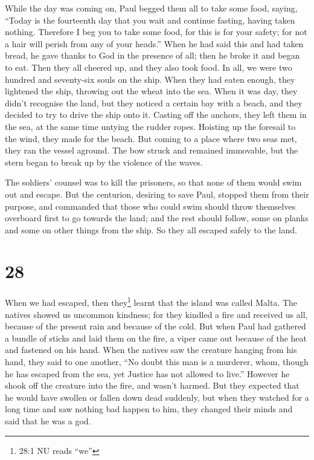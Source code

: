  While the day was coming on, Paul begged them all to take
some food, saying, ``Today is the fourteenth day that you wait and
continue fasting, having taken nothing.  Therefore I beg
you to take some food, for this is for your safety; for not a hair will
perish from any of your heads.''  When he had said this and
had taken bread, he gave thanks to God in the presence of all; then he
broke it and began to eat.  Then they all cheered up, and
they also took food.  In all, we were two hundred and
seventy-six souls on the ship.  When they had eaten enough,
they lightened the ship, throwing out the wheat into the sea.
 When it was day, they didn't recognise the land, but they
noticed a certain bay with a beach, and they decided to try to drive the
ship onto it.  Casting off the anchors, they left them in
the sea, at the same time untying the rudder ropes. Hoisting up the
foresail to the wind, they made for the beach.  But coming
to a place where two seas met, they ran the vessel aground. The bow
struck and remained immovable, but the stern began to break up by the
violence of the waves.

 The soldiers' counsel was to kill the prisoners, so that
none of them would swim out and escape.  But the centurion,
desiring to save Paul, stopped them from their purpose, and commanded
that those who could swim should throw themselves overboard first to go
towards the land;  and the rest should follow, some on
planks and some on other things from the ship. So they all escaped
safely to the land.

\hypertarget{section-27}{%
\section{28}\label{section-27}}

 When we had escaped, then they\footnote{28:1 NU reads
  ``we''} learnt that the island was called Malta.  The
natives showed us uncommon kindness; for they kindled a fire and
received us all, because of the present rain and because of the cold.
 But when Paul had gathered a bundle of sticks and laid them
on the fire, a viper came out because of the heat and fastened on his
hand.  When the natives saw the creature hanging from his
hand, they said to one another, ``No doubt this man is a murderer, whom,
though he has escaped from the sea, yet Justice has not allowed to
live.''  However he shook off the creature into the fire,
and wasn't harmed.  But they expected that he would have
swollen or fallen down dead suddenly, but when they watched for a long
time and saw nothing bad happen to him, they changed their minds and
said that he was a god.

